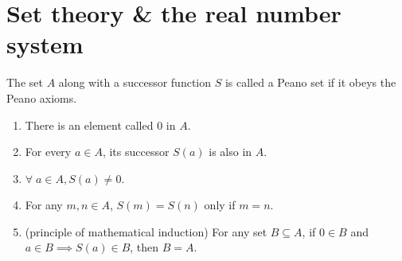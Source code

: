 \section{Set theory \& the real number system}

\begin{defn} \label{defn:peano set}
    The set $A$ along with a successor function $S$ is called a Peano set if it obeys the Peano axioms.
    \begin{enumerate}[label=(P\arabic*)]
        \item \label{peano:zero}
            There is an element called 0 in $A$.
        \item \label{peano:succ}
            For every $a \in A$, its successor $S(a)$ is also in $A$.
        \item \label{peano:not succ}
            $\forall \; a \in A, S(a) \neq 0$.
        \item \label{peano:injective}
            For any $m, n \in A$, $S(m) = S(n)$ only if $m = n$.
        \item \label{peano:induction}
            (principle of mathematical induction) For any set $B \subseteq A$, if $0 \in B$ and $a \in B \implies S(a) \in B$, then $B = A$.
    \end{enumerate}
\end{defn}





